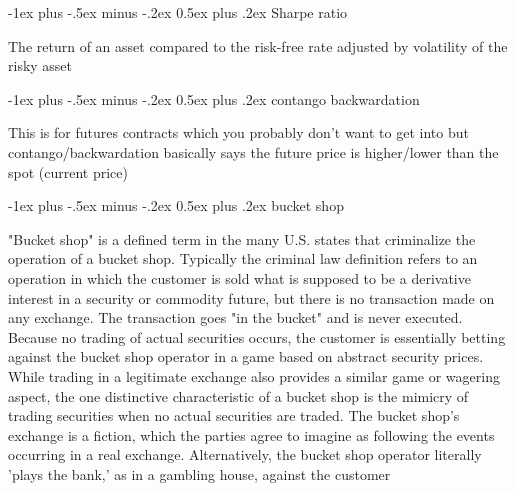 \documentclass[10pt,landscape]{article}
\makeatletter
\renewcommand{\section}{\@startsection{section}{1}{0mm}%
                                {-1ex plus -.5ex minus -.2ex}%
                                {0.5ex plus .2ex}%
                                {\normalfont\large\bfseries}}
\makeatother
\begin{document}
\begin{multicols}{3}
\section{Sharpe ratio}

The return of an asset compared to the risk-free rate adjusted by volatility of the risky asset

\section{contango backwardation}

This is for futures contracts which you probably don't want to get into but contango/backwardation basically says the future price is higher/lower than the spot (current price)

\section{bucket shop}

"Bucket shop" is a defined term in the many U.S. states that criminalize the operation of a bucket shop. Typically the criminal law definition refers to an operation in which the customer is sold what is supposed to be a derivative interest in a security or commodity future, but there is no transaction made on any exchange. The transaction goes "in the bucket" and is never executed. Because no trading of actual securities occurs, the customer is essentially betting against the bucket shop operator in a game based on abstract security prices. While trading in a legitimate exchange also provides a similar game or wagering aspect, the one distinctive characteristic of a bucket shop is the mimicry of trading securities when no actual securities are traded. The bucket shop's exchange is a fiction, which the parties agree to imagine as following the events occurring in a real exchange. Alternatively, the bucket shop operator literally 'plays the bank,' as in a gambling house, against the customer


\end{multicols}
\end{document}
